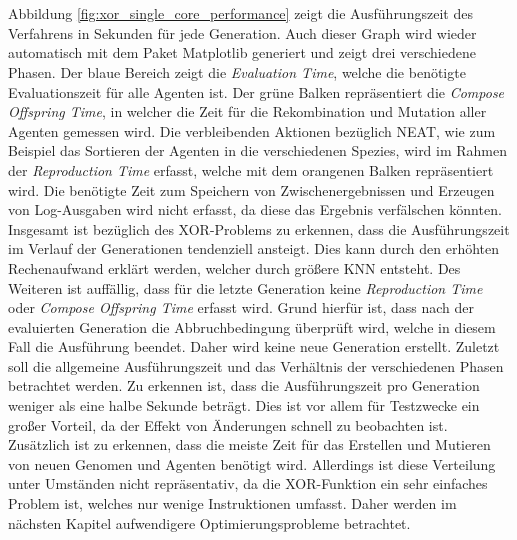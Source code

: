 \\\\
Abbildung \ref{fig:xor_single_core_performance} zeigt die Ausführungszeit des Verfahrens in Sekunden für jede Generation. Auch dieser Graph wird wieder automatisch mit dem Paket Matplotlib generiert und zeigt drei verschiedene Phasen. Der blaue Bereich zeigt die \emph{Evaluation Time}, welche die benötigte Evaluationszeit für alle Agenten ist. Der grüne Balken repräsentiert die \emph{Compose Offspring Time}, in welcher die Zeit für die Rekombination und Mutation aller Agenten gemessen wird. Die verbleibenden Aktionen bezüglich \ac{NEAT}, wie zum Beispiel das Sortieren der Agenten in die verschiedenen Spezies, wird im Rahmen der \emph{Reproduction Time} erfasst, welche mit dem orangenen Balken repräsentiert wird. Die benötigte Zeit zum Speichern von Zwischenergebnissen und Erzeugen von Log-Ausgaben wird nicht erfasst, da diese das Ergebnis verfälschen könnten. Insgesamt ist bezüglich des XOR-Problems zu erkennen, dass die Ausführungszeit im Verlauf der Generationen tendenziell ansteigt. Dies kann durch den erhöhten Rechenaufwand erklärt werden, welcher durch größere \ac{KNN} entsteht. Des Weiteren ist auffällig, dass für die letzte Generation keine \emph{Reproduction Time} oder \emph{Compose Offspring Time} erfasst wird. Grund hierfür ist, dass nach der evaluierten Generation die Abbruchbedingung überprüft wird, welche in diesem Fall die Ausführung beendet. Daher wird  keine neue Generation erstellt. Zuletzt soll die allgemeine Ausführungszeit und das Verhältnis der verschiedenen Phasen betrachtet werden. Zu erkennen ist, dass die Ausführungszeit pro Generation weniger als eine halbe Sekunde beträgt. Dies ist vor allem für Testzwecke ein großer Vorteil, da der Effekt von Änderungen schnell zu beobachten ist. Zusätzlich ist zu erkennen, dass die meiste Zeit für das Erstellen und Mutieren von neuen Genomen und Agenten benötigt wird. Allerdings ist diese Verteilung unter Umständen nicht repräsentativ, da die XOR-Funktion ein sehr einfaches Problem ist, welches nur wenige Instruktionen umfasst. Daher werden im nächsten Kapitel aufwendigere Optimierungsprobleme betrachtet.
